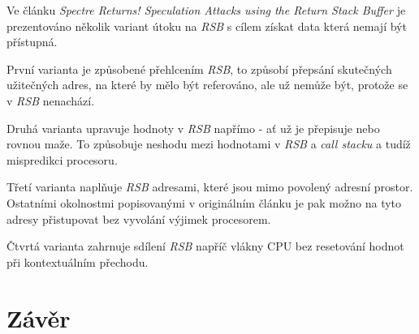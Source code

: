 Ve článku \textit{Spectre Returns! Speculation Attacks using the Return Stack Buffer} je prezentováno několik variant útoku na \textit{RSB} s cílem získat data která nemají být přístupná.

První varianta je způsobené přehlcením \textit{RSB}, to způsobí přepsání skutečných užitečných adres, na které by mělo být referováno, ale už nemůže být, protože se v \textit{RSB} nenachází.

Druhá varianta upravuje hodnoty v \textit{RSB} napřímo - ať už je přepisuje nebo rovnou maže.
To způsobuje neshodu mezi hodnotami v \textit{RSB} a \textit{call stacku} a tudíž mispredikci procesoru.

Třetí varianta naplňuje \textit{RSB} adresami, které jsou mimo povolený adresní prostor.
Ostatními okolnostmi popisovanými v originálním článku je pak možno na tyto adresy přistupovat bez vyvolání výjimek procesorem.

Čtvrtá varianta zahrnuje sdílení \textit{RSB} napříč vlákny CPU bez resetování hodnot při kontextuálním přechodu.

\section{Závěr}
